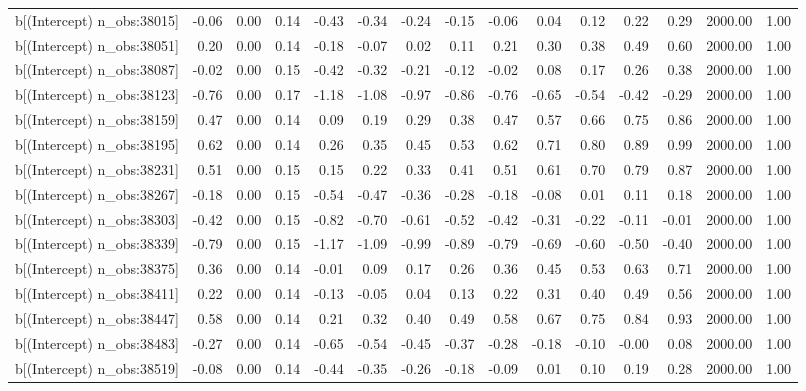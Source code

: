 \begin{table}[ht]
\begin{tabular}{rrrrrrrrrrrrrrr}
  b[(Intercept) n\_obs:38015] & -0.06 & 0.00 & 0.14 & -0.43 & -0.34 & -0.24 & -0.15 & -0.06 & 0.04 & 0.12 & 0.22 & 0.29 & 2000.00 & 1.00 \\ 
  b[(Intercept) n\_obs:38051] & 0.20 & 0.00 & 0.14 & -0.18 & -0.07 & 0.02 & 0.11 & 0.21 & 0.30 & 0.38 & 0.49 & 0.60 & 2000.00 & 1.00 \\ 
  b[(Intercept) n\_obs:38087] & -0.02 & 0.00 & 0.15 & -0.42 & -0.32 & -0.21 & -0.12 & -0.02 & 0.08 & 0.17 & 0.26 & 0.38 & 2000.00 & 1.00 \\ 
  b[(Intercept) n\_obs:38123] & -0.76 & 0.00 & 0.17 & -1.18 & -1.08 & -0.97 & -0.86 & -0.76 & -0.65 & -0.54 & -0.42 & -0.29 & 2000.00 & 1.00 \\ 
  b[(Intercept) n\_obs:38159] & 0.47 & 0.00 & 0.14 & 0.09 & 0.19 & 0.29 & 0.38 & 0.47 & 0.57 & 0.66 & 0.75 & 0.86 & 2000.00 & 1.00 \\ 
  b[(Intercept) n\_obs:38195] & 0.62 & 0.00 & 0.14 & 0.26 & 0.35 & 0.45 & 0.53 & 0.62 & 0.71 & 0.80 & 0.89 & 0.99 & 2000.00 & 1.00 \\ 
  b[(Intercept) n\_obs:38231] & 0.51 & 0.00 & 0.15 & 0.15 & 0.22 & 0.33 & 0.41 & 0.51 & 0.61 & 0.70 & 0.79 & 0.87 & 2000.00 & 1.00 \\ 
  b[(Intercept) n\_obs:38267] & -0.18 & 0.00 & 0.15 & -0.54 & -0.47 & -0.36 & -0.28 & -0.18 & -0.08 & 0.01 & 0.11 & 0.18 & 2000.00 & 1.00 \\ 
  b[(Intercept) n\_obs:38303] & -0.42 & 0.00 & 0.15 & -0.82 & -0.70 & -0.61 & -0.52 & -0.42 & -0.31 & -0.22 & -0.11 & -0.01 & 2000.00 & 1.00 \\ 
  b[(Intercept) n\_obs:38339] & -0.79 & 0.00 & 0.15 & -1.17 & -1.09 & -0.99 & -0.89 & -0.79 & -0.69 & -0.60 & -0.50 & -0.40 & 2000.00 & 1.00 \\ 
  b[(Intercept) n\_obs:38375] & 0.36 & 0.00 & 0.14 & -0.01 & 0.09 & 0.17 & 0.26 & 0.36 & 0.45 & 0.53 & 0.63 & 0.71 & 2000.00 & 1.00 \\ 
  b[(Intercept) n\_obs:38411] & 0.22 & 0.00 & 0.14 & -0.13 & -0.05 & 0.04 & 0.13 & 0.22 & 0.31 & 0.40 & 0.49 & 0.56 & 2000.00 & 1.00 \\ 
  b[(Intercept) n\_obs:38447] & 0.58 & 0.00 & 0.14 & 0.21 & 0.32 & 0.40 & 0.49 & 0.58 & 0.67 & 0.75 & 0.84 & 0.93 & 2000.00 & 1.00 \\ 
  b[(Intercept) n\_obs:38483] & -0.27 & 0.00 & 0.14 & -0.65 & -0.54 & -0.45 & -0.37 & -0.28 & -0.18 & -0.10 & -0.00 & 0.08 & 2000.00 & 1.00 \\ 
  b[(Intercept) n\_obs:38519] & -0.08 & 0.00 & 0.14 & -0.44 & -0.35 & -0.26 & -0.18 & -0.09 & 0.01 & 0.10 & 0.19 & 0.28 & 2000.00 & 1.00 \\ 

\end{tabular}
\end{table}
